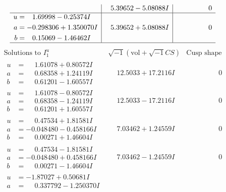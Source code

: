 \documentclass[1p]{elsarticle_modified}
\theoremstyle{definition}
\newcommand{\I}{\sqrt{-1}}
\begin{document}
$$\begin{array}{c|c|c}
 & \phantom{-}5.39652 - 5.08088 I & \phantom{-0.000000 } 0 \\ \hline\begin{aligned}
u &= \phantom{-}1.69998 - 0.25374 I \\
a &= -0.298306 + 1.350070 I \\
b &= \phantom{-}0.15069 - 1.46462 I\end{aligned}
 & \phantom{-}5.39652 + 5.08088 I & \phantom{-0.000000 } 0\\
 \hline 
 \end{array}$$\newpage$$\begin{array}{c|c|c}  
\text{Solutions to }I^u_{1}& \I (\text{vol} + \sqrt{-1}CS) & \text{Cusp shape}\\
 \hline 
\begin{aligned}
u &= \phantom{-}1.61078 + 0.80572 I \\
a &= \phantom{-}0.68358 + 1.24119 I \\
b &= \phantom{-}0.61201 - 1.60557 I\end{aligned}
 & \phantom{-}12.5033 + 17.2116 I & \phantom{-0.000000 } 0 \\ \hline\begin{aligned}
u &= \phantom{-}1.61078 - 0.80572 I \\
a &= \phantom{-}0.68358 - 1.24119 I \\
b &= \phantom{-}0.61201 + 1.60557 I\end{aligned}
 & \phantom{-}12.5033 - 17.2116 I & \phantom{-0.000000 } 0 \\ \hline\begin{aligned}
u &= \phantom{-}0.47534 + 1.81581 I \\
a &= -0.048480 - 0.458166 I \\
b &= \phantom{-}0.00271 + 1.46604 I\end{aligned}
 & \phantom{-}7.03462 + 1.24559 I & \phantom{-0.000000 } 0 \\ \hline\begin{aligned}
u &= \phantom{-}0.47534 - 1.81581 I \\
a &= -0.048480 + 0.458166 I \\
b &= \phantom{-}0.00271 - 1.46604 I\end{aligned}
 & \phantom{-}7.03462 - 1.24559 I & \phantom{-0.000000 } 0 \\ \hline\begin{aligned}
u &= -1.87027 + 0.50681 I \\
a &= \phantom{-}0.337792 - 1.250370 I \\

\end{aligned}
\end{array}$$
\end{document}
